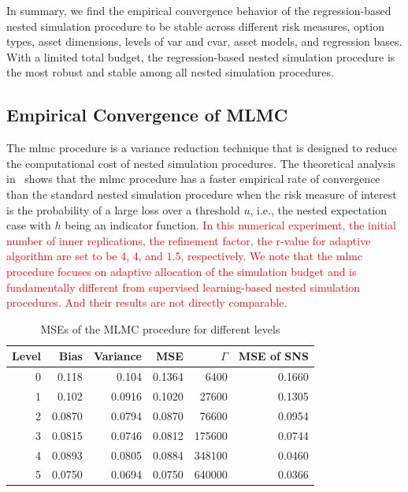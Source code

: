 In summary, we find the empirical convergence behavior of the regression-based nested simulation procedure to be stable across different risk measures, option types, asset dimensions, levels of \gls{var} and \gls{cvar}, asset models, and regression bases.
With a limited total budget, the regression-based nested simulation procedure is the most robust and stable among all nested simulation procedures. 

\subsection{Empirical Convergence of MLMC}\label{sec1:empirical-mlmc}

The \gls{mlmc} procedure is a variance reduction technique that is designed to reduce the computational cost of nested simulation procedures.
The theoretical analysis in~\cite{giles2019multilevel} shows that the \gls{mlmc} procedure has a faster empirical rate of convergence than the standard nested simulation procedure when the risk measure of interest is the probability of a large loss over a threshold $u$, i.e., the nested expectation case with $h$ being an indicator function.
\textcolor{red}{In this numerical experiment, the initial number of inner replications, the refinement factor, the r-value for adaptive algorithm are set to be $4$, $4$, and $1.5$, respectively.}
\textcolor{red}{We note that the \gls{mlmc} procedure focuses on adaptive allocation of the simulation budget and is fundamentally different from supervised learning-based nested simulation procedures. And their results are not directly comparable.}

\begin{table}[ht]
    \centering
    \begin{tabular}{rrrrrr}
    \toprule
    \textbf{Level} & \textbf{Bias} & \textbf{Variance} & \textbf{MSE} & $\Gamma$ & \textbf{MSE of SNS} \\ 
    \hline\hline
    0 & 0.118  & 0.104  & 0.1364 & 6400     & 0.1660    \\
    1 & 0.102  & 0.0916 & 0.1020 & 27600    & 0.1305    \\
    2 & 0.0870 & 0.0794 & 0.0870 & 76600    & 0.0954    \\
    3 & 0.0815 & 0.0746 & 0.0812 & 175600   & 0.0744    \\
    4 & 0.0893 & 0.0805 & 0.0884 & 348100   & 0.0460    \\
    5 & 0.0750 & 0.0694 & 0.0750 & 640000   & 0.0366    \\
    \bottomrule
    \end{tabular}
    \caption{MSEs of the MLMC procedure for different levels}
\label{tab1:mlmc-mse}
\end{table}

